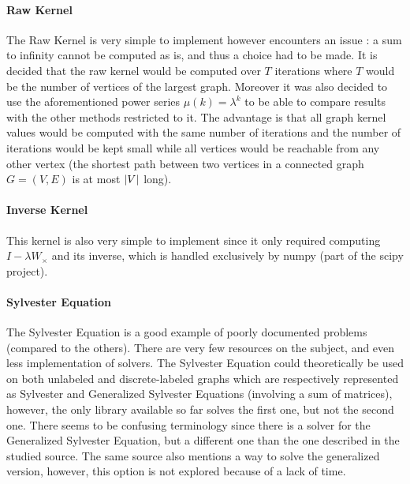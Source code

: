 \documentclass{article}
\DeclarePairedDelimiter{\abs}{\lvert}{\rvert}
\theoremstyle{definition}
\begin{document}
\paragraph{Raw Kernel}
The Raw Kernel is very simple to implement however encounters an issue : a sum to infinity cannot be computed as is, and thus a choice had to be made. It is decided that the raw kernel would be computed over $T$ iterations where $T$ would be the number of vertices of the largest graph. Moreover it was also decided to use the aforementioned power series $\mu(k)=\lambda^k$ to be able to compare results with the other methods restricted to it. The advantage is that all graph kernel values would be computed with the same number of iterations and the number of iterations would be kept small while all vertices would be reachable from any other vertex (the shortest path between two vertices in a connected graph $G=(V,E)$ is at most $\abs{V}$ long).  
\paragraph{Inverse Kernel}
This kernel is also very simple to implement  since it only required computing $I-\lambda W_{\times}$ and its inverse, which is handled exclusively by numpy (part of the scipy project).
\paragraph{Sylvester Equation}
The Sylvester Equation is a good example of poorly documented problems (compared to the others). There are very few resources on the subject, and even less implementation of solvers. The Sylvester Equation could theoretically be used on both unlabeled and discrete-labeled graphs which are respectively represented as Sylvester and Generalized Sylvester Equations (involving a sum of matrices), however, the only library available so far solves the first one, but not the second one. There seems to be confusing terminology since there is a solver for the Generalized Sylvester Equation, but a different one than the one described in the studied source\cite{vishwanathan_graph_2010}. The same source also mentions a way to solve the generalized version\cite{lathauwer2004}, however, this option is not explored because of a lack of time.  
\end{document}
